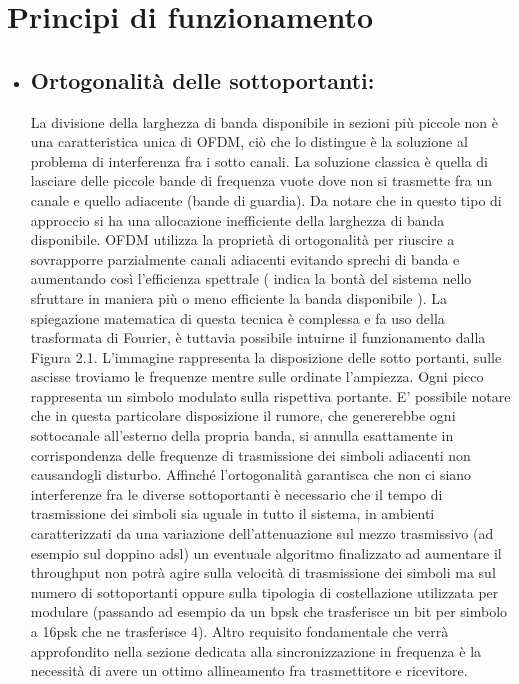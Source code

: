 \section{Principi di funzionamento}
\begin{itemize}
	 \item \subsection{Ortogonalità delle sottoportanti: } La divisione della larghezza di banda disponibile in sezioni più piccole non è una caratteristica unica di OFDM, ciò che lo distingue è la soluzione al problema di interferenza fra i sotto canali. La soluzione classica è quella di lasciare delle piccole bande di frequenza vuote dove non si trasmette fra un canale e quello adiacente (bande di guardia). Da notare che in questo tipo di approccio si ha una allocazione inefficiente della larghezza di banda disponibile. OFDM utilizza la proprietà di ortogonalità per riuscire a sovrapporre parzialmente canali adiacenti evitando sprechi di banda e aumentando così l'efficienza spettrale ( indica la bontà del sistema nello sfruttare in maniera più o meno efficiente la banda disponibile \cite{efficienzaSpettrale}).
	 La spiegazione matematica di questa tecnica è complessa e fa uso della trasformata di Fourier, è tuttavia possibile intuirne il funzionamento dalla Figura 2.1. L'immagine rappresenta la disposizione delle sotto portanti, sulle ascisse troviamo le frequenze mentre sulle ordinate l'ampiezza. Ogni picco rappresenta un simbolo modulato sulla rispettiva portante. E' possibile notare che in questa particolare disposizione il rumore, che genererebbe ogni sottocanale all'esterno della propria banda, si annulla esattamente in corrispondenza delle frequenze di trasmissione dei simboli adiacenti non causandogli disturbo. Affinché l'ortogonalità garantisca che non ci siano interferenze fra le diverse sottoportanti è necessario che il tempo di trasmissione dei simboli sia uguale in tutto il sistema, in ambienti caratterizzati da una variazione dell'attenuazione sul mezzo trasmissivo (ad esempio sul doppino adsl) un eventuale algoritmo finalizzato ad aumentare il throughput non potrà agire sulla velocità di trasmissione dei simboli ma sul numero di sottoportanti oppure sulla tipologia di costellazione utilizzata per modulare (passando ad esempio da un bpsk che trasferisce un bit per simbolo a 16psk che ne trasferisce 4). Altro requisito fondamentale che verrà approfondito nella sezione dedicata alla sincronizzazione in frequenza è la necessità di avere un ottimo allineamento fra trasmettitore e ricevitore.
	 

\end{itemize}
